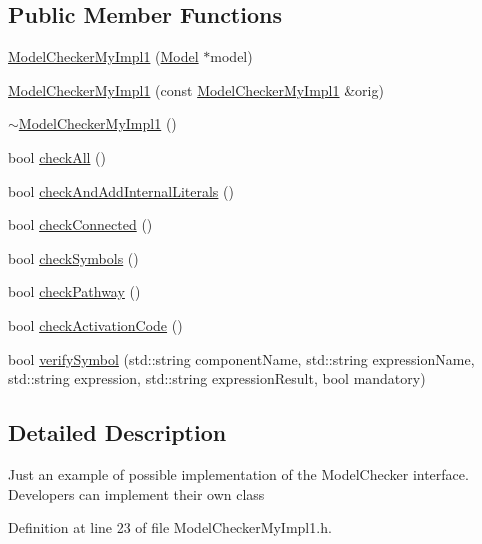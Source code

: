 \subsection*{Public Member Functions}
\begin{DoxyCompactItemize}
\item 
\hyperlink{class_model_checker_my_impl1_a1e20144586ebb7290ee270ed4f61d322}{Model\-Checker\-My\-Impl1} (\hyperlink{class_model}{Model} $\ast$model)
\item 
\hyperlink{class_model_checker_my_impl1_ad66b5eebec60d37add1629f96e9488ce}{Model\-Checker\-My\-Impl1} (const \hyperlink{class_model_checker_my_impl1}{Model\-Checker\-My\-Impl1} \&orig)
\item 
\hyperlink{class_model_checker_my_impl1_acd10fffc264cf286a304fce9538a7189}{$\sim$\-Model\-Checker\-My\-Impl1} ()
\item 
bool \hyperlink{class_model_checker_my_impl1_adbed52d807b882ee75f10372b8b379e1}{check\-All} ()
\item 
bool \hyperlink{class_model_checker_my_impl1_aa6dc0de6220d37a63a3037a090335d61}{check\-And\-Add\-Internal\-Literals} ()
\item 
bool \hyperlink{class_model_checker_my_impl1_a2a7abd0bdf163415ec9aa92741ea5d03}{check\-Connected} ()
\item 
bool \hyperlink{class_model_checker_my_impl1_a37856818d6597563f079401bf6652cbb}{check\-Symbols} ()
\item 
bool \hyperlink{class_model_checker_my_impl1_afd162b06a60ec5bf1e3a4f3340728ac3}{check\-Pathway} ()
\item 
bool \hyperlink{class_model_checker_my_impl1_a1139d516075b03d96eaa0db01e108c2c}{check\-Activation\-Code} ()
\item 
bool \hyperlink{class_model_checker_my_impl1_af92c7b51b8207c1718b496df104b1f11}{verify\-Symbol} (std\-::string component\-Name, std\-::string expression\-Name, std\-::string expression, std\-::string expression\-Result, bool mandatory)
\end{DoxyCompactItemize}


\subsection{Detailed Description}
Just an example of possible implementation of the Model\-Checker interface. Developers can implement their own class 

Definition at line 23 of file Model\-Checker\-My\-Impl1.\-h.



